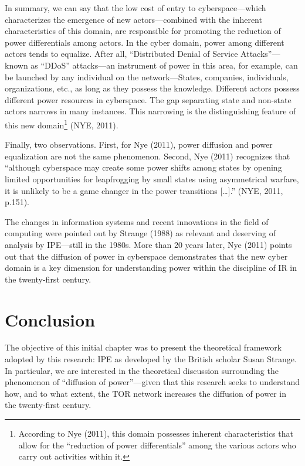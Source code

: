 In summary, we can say that the low cost of entry to cyberspace---which characterizes the emergence of new actors---combined with the inherent characteristics of this domain, are responsible for promoting the reduction of power differentials among actors. In the cyber domain, power among different actors tends to equalize. After all, ``Distributed Denial of Service Attacks''---known as ``DDoS'' attacks---an instrument of power in this area, for example, can be launched by any individual on the network---States, companies, individuals, organizations, etc., as long as they possess the knowledge. Different actors possess different power resources in cyberspace. The gap separating state and non-state actors narrows in many instances. This narrowing is the distinguishing feature of this new domain\footnote{According to Nye (2011), this domain possesses inherent characteristics that allow for the ``reduction of power differentials'' among the various actors who carry out activities within it.} (NYE, 2011).

Finally, two observations. First, for Nye (2011), power diffusion and power equalization are not the same phenomenon. Second, Nye (2011) recognizes that ``although cyberspace may create some power shifts among states by opening limited opportunities for leapfrogging by small states using asymmetrical warfare, it is unlikely to be a game changer in the power transitions {[}\ldots{]}.'' (NYE, 2011, p.151).

The changes in information systems and recent innovations in the field of computing were pointed out by Strange (1988) as relevant and deserving of analysis by IPE---still in the 1980s. More than 20 years later, Nye (2011) points out that the diffusion of power in cyberspace demonstrates that the new cyber domain is a key dimension for understanding power within the discipline of IR in the twenty-first century.

\section{Conclusion}

The objective of this initial chapter was to present the theoretical framework adopted by this research: IPE as developed by the British scholar Susan Strange. In particular, we are interested in the theoretical discussion surrounding the phenomenon of ``diffusion of power''---given that this research seeks to understand how, and to what extent, the TOR network increases the diffusion of power in the twenty-first century.


